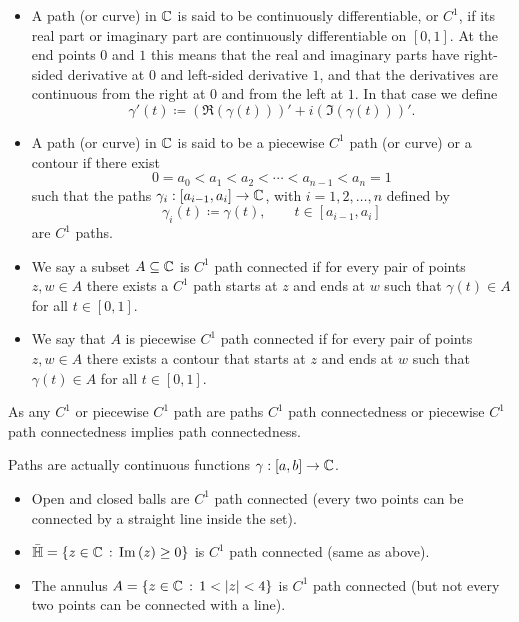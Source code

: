 \documentclass[10pt, a4paper]{article}
\begin{document}
\begin{definition}\phantom{}
    \begin{itemize}
        \item A path
        (or curve)
        in $\mathbb{C}$ is said to be continuously differentiable,
        or $C ^ 1$,
        if its real part or imaginary part are continuously differentiable on $[0, 1]$.
        At the end points $0$ and $1$ this means that the real and imaginary parts have right-sided derivative at $0$ and left-sided derivative $1$,
        and that the derivatives are continuous from the right at $0$ and from the left at $1$.
        In that case we define
        \[
        \gamma'(t) \coloneqq (\Re(\gamma(t)))' + i(\Im(\gamma(t)))'.
        \]

        \item A path
        (or curve)
        in $\mathbb{C}$ is said to be a piecewise $C ^ 1$ path
        (or curve)
        or a contour if there exist
        \[
        0 = a_0 < a_1 < a_2 < \dotsi < a_{n - 1} < a_n = 1
        \]
        such that the paths $\gamma_i : [a_{i - 1}, a_i] \to \mathbb{C}$,
        with $i = 1, 2, \dotsc, n$ defined by
        \[
        \gamma_i(t) \coloneqq \gamma(t),\qquad t \in [a_{i - 1}, a_i]
        \]
        are $C ^ 1$ paths.

        \item We say a subset $A \subseteq \mathbb{C}$ is $C ^ 1$ path connected if for every pair of points $z, w \in A$ there exists a $C ^ 1$ path starts at $z$ and ends at $w$ such that $\gamma(t) \in A$ for all $t \in [0, 1]$.

        \item We say that $A$ is piecewise $C ^ 1$ path connected if for every pair of points $z, w \in A$ there exists a contour that starts at $z$ and ends at $w$ such that $\gamma(t) \in A$ for all $t \in [0, 1]$.
    \end{itemize}
\end{definition}

As any $C ^ 1$ or piecewise $C ^ 1$ path are paths $C ^ 1$ path connectedness or piecewise $C ^ 1$ path connectedness implies path connectedness.

Paths are actually continuous functions $\gamma : [a, b] \to \mathbb{C}$.

\begin{example}\phantom{}
    \begin{itemize}
        \item Open and closed balls are $C ^ 1$ path connected
        (every two points can be connected by a straight line inside the set).

        \item $\bar{\mathbb{H}} = \{z \in \mathbb{C}\,:\, \mathrm{Im}\,(z) \geq 0\}$ is $C ^ 1$ path connected
        (same as above).

        \item The annulus $A = \{z \in \mathbb{C}\,:\, 1 < |z| < 4\}$ is $C ^ 1$ path connected
        (but not every two points can be connected with a line).
    \end{itemize}
\end{example}
\end{document}
